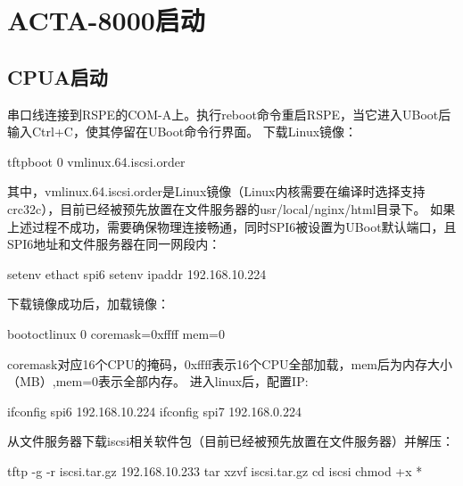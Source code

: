 \section{ACTA-8000启动}
\subsection{CPUA启动}
串口线连接到RSPE的COM-A上。执行reboot命令重启RSPE，当它进入UBoot后输入Ctrl+C，使其停留在UBoot命令行界面。
下载Linux镜像：
\begin{shellcmd}
tftpboot 0 vmlinux.64.iscsi.order
\end{shellcmd}

其中，vmlinux.64.iscsi.order是Linux镜像（Linux内核需要在编译时选择支持crc32c），目前已经被预先放置在文件服务器的usr/local/nginx/html目录下。
如果上述过程不成功，需要确保物理连接畅通，同时SPI6被设置为UBoot默认端口，且SPI6地址和文件服务器在同一网段内：
\begin{shellcmd}
setenv ethact spi6
setenv ipaddr 192.168.10.224
\end{shellcmd}

下载镜像成功后，加载镜像：
\begin{shellcmd}
bootoctlinux 0 coremask=0xffff mem=0
\end{shellcmd}

coremask对应16个CPU的掩码，0xffff表示16个CPU全部加载，mem后为内存大小（MB）,mem=0表示全部内存。
进入linux后，配置IP:
\begin{shellcmd}
ifconfig spi6 192.168.10.224
ifconfig spi7 192.168.0.224
\end{shellcmd}

从文件服务器下载iscsi相关软件包（目前已经被预先放置在文件服务器）并解压：
\begin{shellcmd}
tftp -g -r iscsi.tar.gz 192.168.10.233
tar xzvf iscsi.tar.gz
cd iscsi
chmod +x *
\end{shellcmd}

